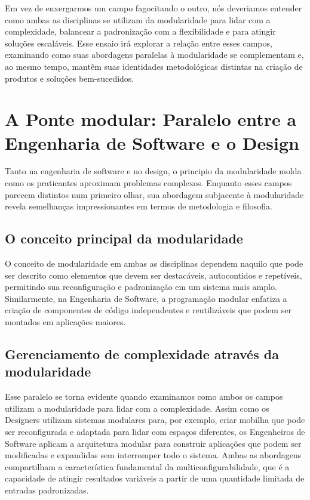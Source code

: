 \documentclass[12pt]{article}
\begin{document}
Em vez de enxergarmos um campo fagocitando o outro, nós deveriamos entender como ambas as disciplinas se utilizam da modularidade para lidar com a complexidade, balancear a padronização com a flexibilidade e para atingir soluções escaláveis. Esse ensaio irá explorar a relação entre esses campos, examinando como suas abordagens paralelas à modularidade se complementam e, ao mesmo tempo, mantêm suas identidades metodológicas distintas na criação de produtos e soluções bem-sucedidos.

\section{A Ponte modular: Paralelo entre a Engenharia de Software e o Design}

Tanto na engenharia de software e no design, o principio da modularidade molda como os praticantes aproximam problemas complexos. Enquanto esses campos parecem distintos num primeiro olhar, sua abordagem subjacente à modularidade revela semelhanças impressionantes em termos de metodologia e filosofia.

\subsection{O conceito principal da modularidade}

O conceito de modularidade em ambas as disciplinas dependem naquilo que pode ser descrito como elementos que devem ser destacáveis, autocontidos e repetíveis, permitindo sua reconfiguração e padronização em um sistema mais amplo. Similarmente, na Engenharia de Software, a programação modular enfatiza a criação de componentes de código independentes e reutilizáveis que podem ser montados em aplicações maiores.

\subsection{Gerenciamento de complexidade através da modularidade}

Esse paralelo se torna evidente quando examinamos como ambos os campos utilizam a modularidade para lidar com a complexidade. Assim como os Designers utilizam sistemas modulares para, por exemplo, criar mobilha que pode ser reconfigurada e adaptada para lidar com espaços diferentes, os Engenheiros de Software aplicam a arquitetura modular para construir aplicações que podem ser modificadas e expandidas sem interromper todo o sistema. Ambas as abordagens compartilham a característica fundamental da multiconfigurabilidade, que é a capacidade de atingir resultados variáveis a partir de uma quantidade limitada de entradas padronizadas.
\end{document}

